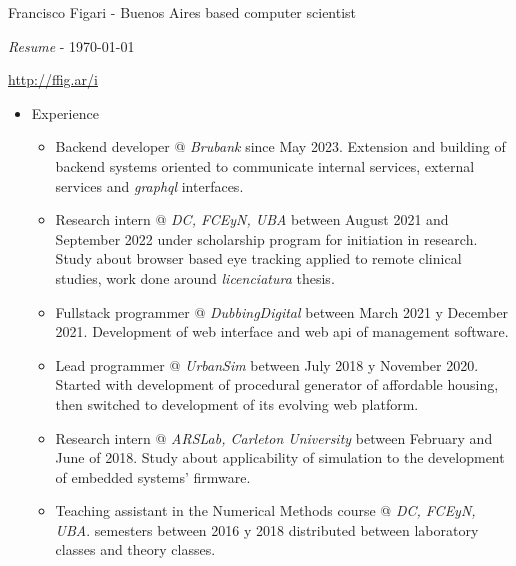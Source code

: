 \documentclass[a4paper]{article}
\begin{document}
\thispagestyle{empty}  %

Francisco Figari - Buenos Aires based computer scientist

\textit{Resume} - \monthyeardate\today

\url{http://ffig.ar/i}

\begin{itemize}

  \item Experience
  \begin{itemize}
    \item
      Backend developer @ \textit{Brubank} since May 2023. \newline
      Extension and building of backend systems oriented to communicate internal
      services, external services and \textit{graphql} interfaces.

    \item
      Research intern @ \textit{DC, FCEyN, UBA} between August 2021 and
      September 2022 under scholarship program for initiation in research.
      \newline
      Study about browser based eye tracking applied to remote clinical
      studies, work done around \textit{licenciatura} thesis.

    \item
      Fullstack programmer @ \textit{DubbingDigital} between March 2021 y
      December 2021.  \newline
      Development of web interface and web api of management software.

    \item
      Lead programmer @ \textit{UrbanSim} between July 2018 y November 2020.
      \newline
      Started with development of procedural generator of affordable housing,
      then switched to development of its evolving web platform.

    \item
      Research intern @ \textit{ARSLab, Carleton University} between February
      and June of 2018. \newline
      Study about applicability of simulation to the development of embedded
      systems' firmware.

    \item
      Teaching assistant in the Numerical Methods course @ \textit{DC, FCEyN,
      UBA}.   semesters between 2016 y 2018 distributed between laboratory classes
      and theory classes.


\end{itemize}
\end{itemize}
\end{document}
